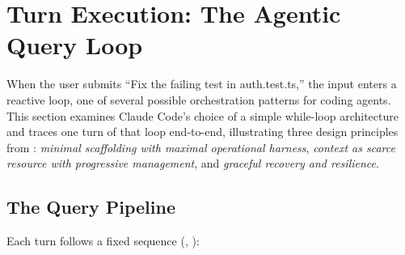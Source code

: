 \section{Turn Execution: The Agentic Query Loop}
\label{sec:turn}

When the user submits ``Fix the failing test in auth.test.ts,'' the input enters a reactive loop, one of several possible orchestration patterns for coding agents. This section examines Claude Code's choice of a simple while-loop architecture and traces one turn of that loop end-to-end, illustrating three design principles from : \emph{minimal scaffolding with maximal operational harness}, \emph{context as scarce resource with progressive management}, and \emph{graceful recovery and resilience}.

\subsection{The Query Pipeline}
\label{sec:turn:pipeline}

Each turn follows a fixed sequence (, ):

